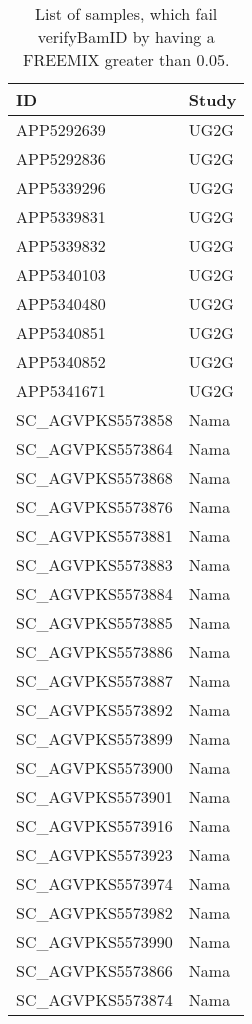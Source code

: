\begin{table}[htp]
\centering
\begin{tabular}{|l|l|} \hline
ID & Study \\ \hline
APP5292639 & UG2G \\
APP5292836 & UG2G \\
APP5339296 & UG2G \\
APP5339831 & UG2G \\
APP5339832 & UG2G \\
APP5340103 & UG2G \\
APP5340480 & UG2G \\
APP5340851 & UG2G \\
APP5340852 & UG2G \\
APP5341671 & UG2G \\
SC\_AGVPKS5573858 & Nama \\
SC\_AGVPKS5573864 & Nama \\
SC\_AGVPKS5573868 & Nama \\
SC\_AGVPKS5573876 & Nama \\
SC\_AGVPKS5573881 & Nama \\
SC\_AGVPKS5573883 & Nama \\
SC\_AGVPKS5573884 & Nama \\
SC\_AGVPKS5573885 & Nama \\
SC\_AGVPKS5573886 & Nama \\
SC\_AGVPKS5573887 & Nama \\
SC\_AGVPKS5573892 & Nama \\
SC\_AGVPKS5573899 & Nama \\
SC\_AGVPKS5573900 & Nama \\
SC\_AGVPKS5573901 & Nama \\
SC\_AGVPKS5573916 & Nama \\
SC\_AGVPKS5573923 & Nama \\
SC\_AGVPKS5573974 & Nama \\
SC\_AGVPKS5573982 & Nama \\
SC\_AGVPKS5573990 & Nama \\
SC\_AGVPKS5573866 & Nama \\
SC\_AGVPKS5573874 & Nama \\
\hline
\end{tabular}
\caption{List of samples, which fail verifyBamID by having a FREEMIX greater than 0.05.}
\label{table:failVBI}
\end{table}